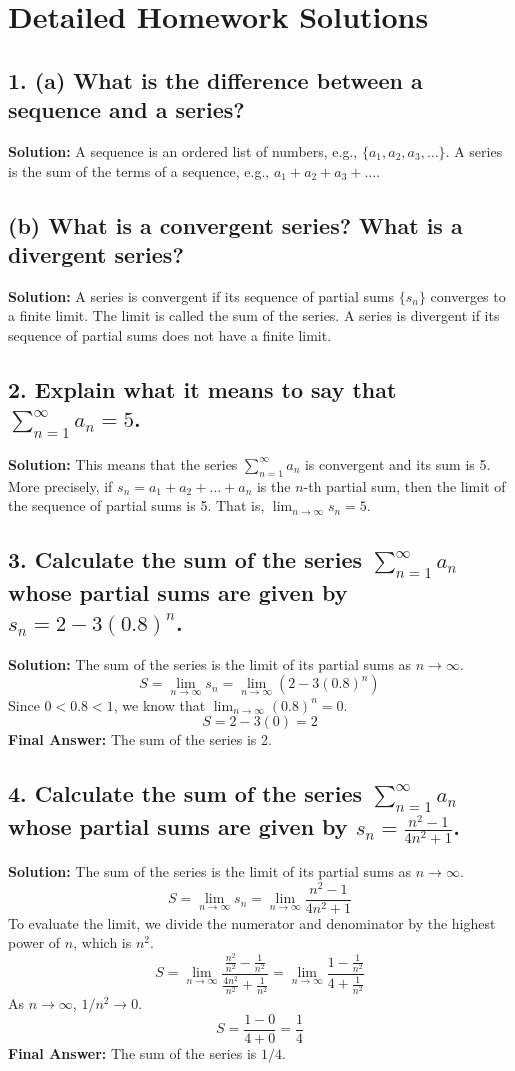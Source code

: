 \documentclass{article}
\begin{document}
\section{Detailed Homework Solutions}

\subsection*{1. (a) What is the difference between a sequence and a series?}
\textbf{Solution:} A sequence is an ordered list of numbers, e.g., $\{a_1, a_2, a_3, \dots\}$. A series is the sum of the terms of a sequence, e.g., $a_1 + a_2 + a_3 + \dots$.

\subsection*{(b) What is a convergent series? What is a divergent series?}
\textbf{Solution:} A series is convergent if its sequence of partial sums $\{s_n\}$ converges to a finite limit. The limit is called the sum of the series. A series is divergent if its sequence of partial sums does not have a finite limit.

\subsection*{2. Explain what it means to say that $\sum_{n=1}^{\infty} a_n = 5$.}
\textbf{Solution:} This means that the series $\sum_{n=1}^{\infty} a_n$ is convergent and its sum is 5. More precisely, if $s_n = a_1 + a_2 + \dots + a_n$ is the $n$-th partial sum, then the limit of the sequence of partial sums is 5. That is, $\lim_{n \to \infty} s_n = 5$.

\subsection*{3. Calculate the sum of the series $\sum_{n=1}^{\infty} a_n$ whose partial sums are given by $s_n = 2 - 3(0.8)^n$.}
\textbf{Solution:} The sum of the series is the limit of its partial sums as $n \to \infty$.
\[ S = \lim_{n \to \infty} s_n = \lim_{n \to \infty} \left(2 - 3(0.8)^n\right) \]
Since $0 < 0.8 < 1$, we know that $\lim_{n \to \infty} (0.8)^n = 0$.
\[ S = 2 - 3(0) = 2 \]
\textbf{Final Answer:} The sum of the series is 2.

\subsection*{4. Calculate the sum of the series $\sum_{n=1}^{\infty} a_n$ whose partial sums are given by $s_n = \frac{n^2 - 1}{4n^2 + 1}$.}
\textbf{Solution:} The sum of the series is the limit of its partial sums as $n \to \infty$.
\[ S = \lim_{n \to \infty} s_n = \lim_{n \to \infty} \frac{n^2 - 1}{4n^2 + 1} \]
To evaluate the limit, we divide the numerator and denominator by the highest power of $n$, which is $n^2$.
\[ S = \lim_{n \to \infty} \frac{\frac{n^2}{n^2} - \frac{1}{n^2}}{\frac{4n^2}{n^2} + \frac{1}{n^2}} = \lim_{n \to \infty} \frac{1 - \frac{1}{n^2}}{4 + \frac{1}{n^2}} \]
As $n \to \infty$, $1/n^2 \to 0$.
\[ S = \frac{1 - 0}{4 + 0} = \frac{1}{4} \]
\textbf{Final Answer:} The sum of the series is $1/4$.
\end{document}
